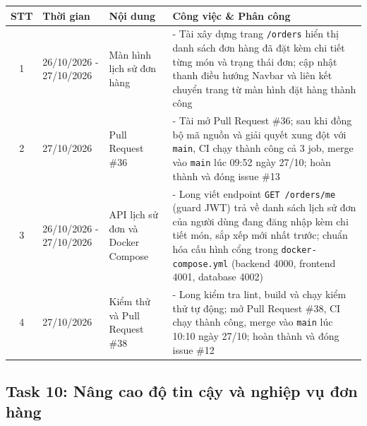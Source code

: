 \documentclass[12pt, a4paper]{article}
\begin{document}
\begin{tabularx}{\textwidth}{|c|p{3.2cm}|Y|Y|}
    \hline
    \textbf{STT} & \textbf{Thời gian} & \textbf{Nội dung} & \textbf{Công việc \& Phân công} \\
    \hline

    1 & 26/10/2026 - 27/10/2026 & Màn hình lịch sử đơn hàng &
    - Tài xây dựng trang \texttt{/orders} hiển thị danh sách đơn hàng đã đặt kèm chi tiết từng món và trạng thái đơn; cập nhật thanh điều hướng Navbar và liên kết chuyển trang từ màn hình đặt hàng thành công \\
    \hline

    2 & 27/10/2026 & Pull Request \#36 &
    - Tài mở Pull Request \#36; sau khi đồng bộ mã nguồn và giải quyết xung đột với \texttt{main}, CI chạy thành công cả 3 job, merge vào \texttt{main} lúc 09:52 ngày 27/10; hoàn thành và đóng issue \#13 \\
    \hline

    3 & 26/10/2026 - 27/10/2026 & API lịch sử đơn và Docker Compose &
    - Long viết endpoint \texttt{GET /orders/me} (guard JWT) trả về danh sách lịch sử đơn của người dùng đang đăng nhập kèm chi tiết món, sắp xếp mới nhất trước; chuẩn hóa cấu hình cổng trong \texttt{docker-compose.yml} (backend 4000, frontend 4001, database 4002) \\
    \hline

    4 & 27/10/2026 & Kiểm thử và Pull Request \#38 &
    - Long kiểm tra lint, build và chạy kiểm thử tự động; mở Pull Request \#38, CI chạy thành công, merge vào \texttt{main} lúc 10:10 ngày 27/10; hoàn thành và đóng issue \#12 \\
    \hline
\end{tabularx}

\vspace{0.8cm}

\subsection*{Task 10: Nâng cao độ tin cậy và nghiệp vụ đơn hàng}
\end{document}
